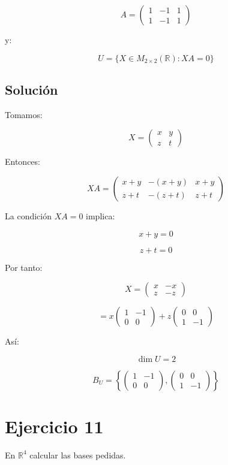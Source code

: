 \documentclass[11pt,a4paper]{article}
\newcommand{\R}{\mathbb{R}}
\newcommand{\dimn}{\operatorname{dim}}
\begin{document}
	\[
	A=
	\begin{pmatrix}
	1&-1&1\\
	1&-1&1
	\end{pmatrix}
	\]

	y:

	\[
	U=
	\{X\in M_{2\times2}(\R):XA=0\}
	\]

	\subsection{Solución}

	Tomamos:

	\[
	X=
	\begin{pmatrix}
	x&y\\
	z&t
	\end{pmatrix}
	\]

	Entonces:

	\[
	XA=
	\begin{pmatrix}
	x+y&-(x+y)&x+y\\
	z+t&-(z+t)&z+t
	\end{pmatrix}
	\]

	La condición $XA=0$ implica:

	\[
	x+y=0
	\]

	\[
	z+t=0
	\]

	Por tanto:

	\[
	X=
	\begin{pmatrix}
	x&-x\\
	z&-z
	\end{pmatrix}
	\]

	\[
	=
	x
	\begin{pmatrix}
	1&-1\\
	0&0
	\end{pmatrix}
	+
	z
	\begin{pmatrix}
	0&0\\
	1&-1
	\end{pmatrix}
	\]

	Así:

	\[
	\boxed{\dimn U=2}
	\]

	\[
	\boxed{
	B_U=
	\left\{
	\begin{pmatrix}
	1&-1\\
	0&0
	\end{pmatrix},
	\begin{pmatrix}
	0&0\\
	1&-1
	\end{pmatrix}
	\right\}
	}
	\]

\section{Ejercicio 11}
	En $\R^4$ calcular las bases pedidas.
\end{document}
